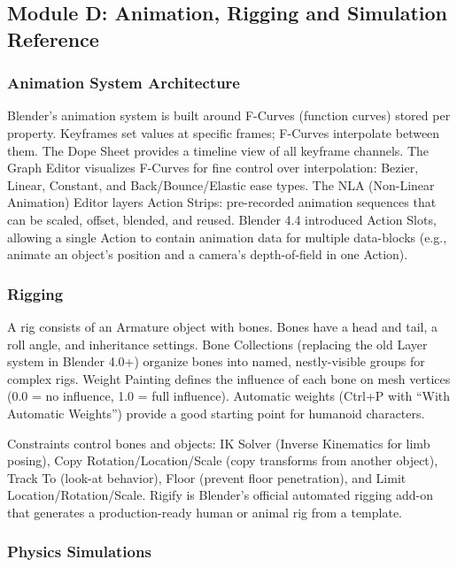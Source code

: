 \documentclass[11pt,letterpaper]{article}
\begin{document}
\subsection{Module D: Animation, Rigging and Simulation Reference}

\subsubsection{Animation System Architecture}

Blender's animation system is built around F-Curves (function curves) stored per property. Keyframes set values at specific frames; F-Curves interpolate between them. The Dope Sheet provides a timeline view of all keyframe channels. The Graph Editor visualizes F-Curves for fine control over interpolation: Bezier, Linear, Constant, and Back/Bounce/Elastic ease types. The NLA (Non-Linear Animation) Editor layers Action Strips: pre-recorded animation sequences that can be scaled, offset, blended, and reused. Blender 4.4 introduced Action Slots, allowing a single Action to contain animation data for multiple data-blocks (e.g., animate an object's position and a camera's depth-of-field in one Action).

\subsubsection{Rigging}

A rig consists of an Armature object with bones. Bones have a head and tail, a roll angle, and inheritance settings. Bone Collections (replacing the old Layer system in Blender 4.0+) organize bones into named, nestly-visible groups for complex rigs. Weight Painting defines the influence of each bone on mesh vertices (0.0 = no influence, 1.0 = full influence). Automatic weights (Ctrl+P with ``With Automatic Weights'') provide a good starting point for humanoid characters.

Constraints control bones and objects: IK Solver (Inverse Kinematics for limb posing), Copy Rotation/Location/Scale (copy transforms from another object), Track To (look-at behavior), Floor (prevent floor penetration), and Limit Location/Rotation/Scale. Rigify is Blender's official automated rigging add-on that generates a production-ready human or animal rig from a template.

\subsubsection{Physics Simulations}
\end{document}
